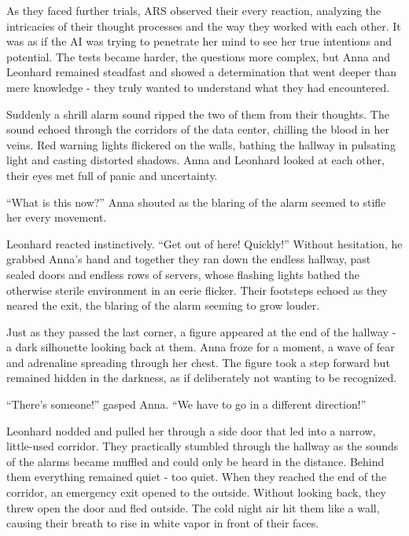 \documentclass[
]{article}
\begin{document}
As they faced further trials, ARS observed their every reaction,
analyzing the intricacies of their thought processes and the way they
worked with each other. It was as if the AI \hspace{0pt}\hspace{0pt}was
trying to penetrate her mind to see her true intentions and potential.
The tests became harder, the questions more complex, but Anna and
Leonhard remained steadfast and showed a determination that went deeper
than mere knowledge - they truly wanted to understand what they had
encountered.

Suddenly a shrill alarm sound ripped the two of them from their
thoughts. The sound echoed through the corridors of the data center,
chilling the blood in her veins. Red warning lights flickered on the
walls, bathing the hallway in pulsating light and casting distorted
shadows. Anna and Leonhard looked at each other, their eyes met full of
panic and uncertainty.

``What is this now?'' Anna shouted as the blaring of the alarm seemed to
stifle her every movement.

Leonhard reacted instinctively. ``Get out of here! Quickly!'' Without
hesitation, he grabbed Anna's hand and together they ran down the
endless hallway, past sealed doors and endless rows of servers, whose
flashing lights bathed the otherwise sterile environment in an eerie
flicker. Their footsteps echoed as they neared the exit, the blaring of
the alarm seeming to grow louder.

Just as they passed the last corner, a figure appeared at the end of the
hallway - a dark silhouette looking back at them. Anna froze for a
moment, a wave of fear and adrenaline spreading through her chest. The
figure took a step forward but remained hidden in the darkness, as if
deliberately not wanting to be recognized.

``There's someone!'' gasped Anna. ``We have to go in a different
direction!''

Leonhard nodded and pulled her through a side door that led into a
narrow, little-used corridor. They practically stumbled through the
hallway as the sounds of the alarms became muffled and could only be
heard in the distance. Behind them everything remained quiet - too
quiet. When they reached the end of the corridor, an emergency exit
opened to the outside. Without looking back, they threw open the door
and fled outside. The cold night air hit them like a wall, causing their
breath to rise in white vapor in front of their faces.
\end{document}
